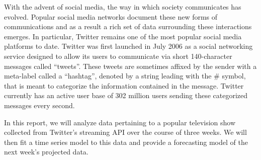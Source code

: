 With the advent of social media, the way in which society communicates has evolved. Popular
social media networks document these new forms of communications and as a result a rich
set of data surrounding these interactions emerges. In particular, Twitter
remains one of the most popular social media platforms
to date. Twitter was first launched in July 2006 as a social networking service
designed to allow its users to communicate via short 140-character messages
called ``tweets''. These tweets are sometimes affixed by the sender with a meta-label
called a ``hashtag'', denoted by a string leading with the \# symbol, that is
meant to categorize the information contained in the
message. Twitter currently has an active user base of 302 million users sending
these categorized messages every second.

In this report, we will analyze data pertaining to a popular television show
collected from Twitter's streaming API over the course of three weeks. We will
then fit a time series model to this data and provide a forecasting model of the
next week's projected data.